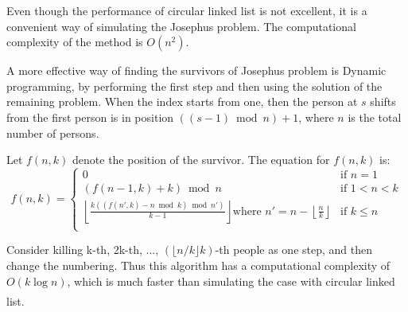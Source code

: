 \documentclass[cn,black,12pt,normal]{elegantnote}
\newcommand{\uct}[1]{\textsuperscript{\textsuperscript{\cite{#1}}}}
\begin{document}
Even though the performance of circular linked list is not excellent, it is a convenient way of simulating the Josephus problem. The computational complexity of the method is $O(n^2)$.

A more effective way of finding the survivors of Josephus problem is Dynamic programming, by performing the first step and then using the solution of the remaining problem. When the index starts from one, then the person at $s$ shifts from the first person is in position ${\displaystyle ((s-1){\bmod {n}})+1}$, where $n$ is the total number of persons.

Let ${\displaystyle f(n,k)}$ denote the position of the survivor. The equation for ${\displaystyle f(n,k)}$ is:
$${\displaystyle f(n,k)={\begin{cases}0&{\text{if }}n=1\\(f(n-1,k)+k){\bmod {n}}&{\text{if }}1<n<k\\\left\lfloor {\frac {k((f(n',k)-n{\bmod {k}}){\bmod {n}}')}{k-1}}\right\rfloor {\text{where }}n'=n-\left\lfloor {\frac {n}{k}}\right\rfloor &{\text{if }}k\leq n\\\end{cases}}}$$

Consider killing k-th, 2k-th, ..., ${\displaystyle (\lfloor n/k\rfloor k)}$-th people as one step, and then change the numbering. Thus this algorithm has a computational complexity of ${\displaystyle O(k\log n)}$, which is much faster than simulating the case with circular linked list.\uct{wiki:Josephus_problem}


\end{document}
